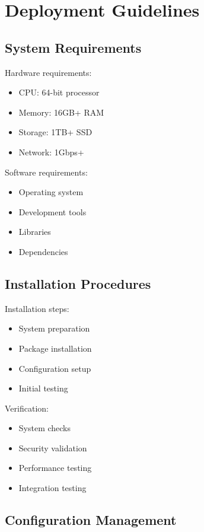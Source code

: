 \documentclass[12pt]{article}
\begin{document}
\section{Deployment Guidelines}

\subsection{System Requirements}

Hardware requirements:

\begin{itemize}
\item CPU: 64-bit processor
\item Memory: 16GB+ RAM
\item Storage: 1TB+ SSD
\item Network: 1Gbps+
\end{itemize}

Software requirements:

\begin{itemize}
\item Operating system
\item Development tools
\item Libraries
\item Dependencies
\end{itemize}

\subsection{Installation Procedures}

Installation steps:

\begin{itemize}
\item System preparation
\item Package installation
\item Configuration setup
\item Initial testing
\end{itemize}

Verification:

\begin{itemize}
\item System checks
\item Security validation
\item Performance testing
\item Integration testing
\end{itemize}

\subsection{Configuration Management}
\end{document}
